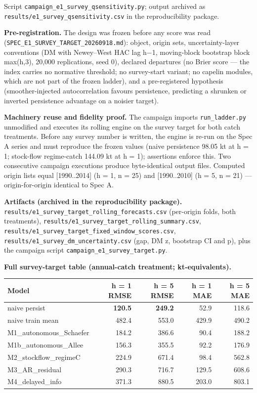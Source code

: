 \documentclass[11pt]{article}
\begin{document}
Script \texttt{campaign\_e1\_survey\_qsensitivity.py}; output archived
as \texttt{results/e1\_survey\_qsensitivity.csv} in the reproducibility
package.

\textbf{Pre-registration.} The design was frozen before any score was
read (\texttt{SPEC\_E1\_SURVEY\_TARGET\_20260918.md}): object, origin
sets, uncertainty-layer conventions (DM with Newey--West HAC lag h−1,
moving-block bootstrap block max(h,3), 20,000 replications, seed 0),
declared departures (no Brier score --- the index carries no normative
threshold; no survey-start variant; no capelin modules, which are not
part of the frozen ladder), and a pre-registered hypothesis
(smoother-injected autocorrelation favours persistence, predicting a
shrunken or inverted persistence advantage on a noisier target).

\textbf{Machinery reuse and fidelity proof.} The campaign imports
\texttt{run\_ladder.py} unmodified and executes its rolling engine on
the survey target for both catch treatments. Before any survey number is
written, the engine is re-run on the Spec A series and must reproduce
the frozen values (naive persistence 98.05 kt at h = 1; stock-flow
regime-catch 144.09 kt at h = 1); assertions enforce this. Two
consecutive campaign executions produce byte-identical output files.
Computed origin lists equal {[}1990..2014{]} (h = 1, n = 25) and
{[}1990..2010{]} (h = 5, n = 21) --- origin-for-origin identical to Spec
A.

\textbf{Artifacts (archived in the reproducibility package).}
\texttt{results/e1\_survey\_target\_rolling\_forecasts.csv} (per-origin
folds, both treatments),
\texttt{results/e1\_survey\_target\_rolling\_summary.csv},
\texttt{results/e1\_survey\_target\_fixed\_window\_scores.csv},
\texttt{results/e1\_survey\_dm\_uncertainty.csv} (gap, DM z, bootstrap
CI and p), plus the campaign script
\texttt{campaign\_e1\_survey\_target.py}.

\textbf{Full survey-target table (annual-catch treatment;
kt-equivalents).}

{\def\LTcaptype{none} %
\begin{longtable}[]{@{}lrrrr@{}}
\toprule\noalign{}
Model & h = 1 RMSE & h = 5 RMSE & h = 1 MAE & h = 5 MAE \\
\midrule\noalign{}
\endhead
\bottomrule\noalign{}
\endlastfoot
naive persist & \textbf{120.5} & \textbf{249.2} & 52.9 & 118.6 \\
naive train mean & 482.4 & 553.0 & 429.9 & 490.2 \\
M1\_autonomous\_Schaefer & 184.2 & 386.6 & 90.4 & 188.2 \\
M1b\_autonomous\_Allee & 156.3 & 355.5 & 92.2 & 176.9 \\
M2\_stockflow\_regimeC & 224.9 & 671.4 & 98.4 & 562.8 \\
M3\_AR\_residual & 290.3 & 716.7 & 129.5 & 608.6 \\
M4\_delayed\_info & 371.3 & 880.5 & 203.0 & 803.1 \\
\end{longtable}
}
\end{document}
